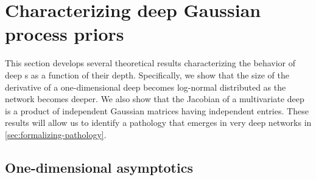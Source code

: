 \documentclass{article} %
\begin{document}
\section{Characterizing deep Gaussian process priors}
\label{sec:characterizing-deep-gps}

This section develops several theoretical results characterizing the behavior of deep \gp{}s as a function of their depth.
Specifically, we show that the size of the derivative of a one-dimensional deep \gp{} becomes log-normal distributed as the network becomes deeper.
We also show that the Jacobian of a multivariate deep \gp{} is a product of independent Gaussian matrices having independent entries.
These results will allow us to identify a pathology that emerges in very deep networks in \cref{sec:formalizing-pathology}.


\subsection{One-dimensional asymptotics}
\label{sec:1d}

\end{document}
